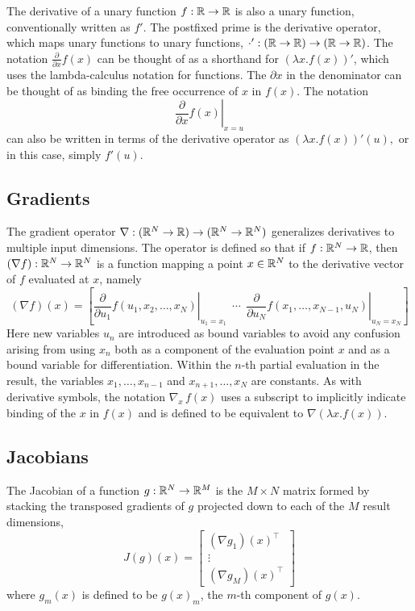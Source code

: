\documentclass[10pt]{article}
\begin{document}
The derivative of a unary function $f:\mathbb{R} \rightarrow \mathbb{R}$ is
also a unary function, conventionally written as $f'$.  The postfixed prime is
the derivative operator, which maps unary functions to unary
functions, $\cdot' : \left(\mathbb{R} \rightarrow \mathbb{R}\right)
\rightarrow \left(\mathbb{R} \rightarrow \mathbb{R}\right)$.  The notation
$\frac{\partial}{\partial x} f(x)$ can be thought of as a shorthand
for $\left( \lambda x. f(x) \right)'$, which uses the lambda-calculus
notation for functions. The $\partial x$ in the denominator can be
thought of as binding the free occurrence of $x$ in $f(x)$.  The
notation
\[
\left. \frac{\partial}{\partial x} f(x) \right|_{x = u}
\]
can also be written in terms of the derivative operator as $\left(
  \lambda x. f(x) \right)'(u),$ or in this case, simply $f'(u)$.

\subsection{Gradients}

The gradient operator $\nabla:(\mathbb{R}^N \rightarrow \mathbb{R})\rightarrow
(\mathbb{R}^N \rightarrow \mathbb{R}^N)$ generalizes derivatives to multiple
input dimensions.  The operator is defined so that if
$f : \mathbb{R}^N \rightarrow \mathbb{R}$, then $(\nabla f):\mathbb{R}^N \rightarrow
\mathbb{R}^N$ is a function mapping a point $x \in \mathbb{R}^N$ to the
derivative vector of $f$ evaluated at $x$, namely
%
\[
(\nabla f)(x) 
= 
\left[
  \left. 
    \frac{\partial}{\partial u_1} f(u_1,x_2,\ldots,x_N)
  \right|_{u_1 = x_1}
  \ \ \cdots \ \ 
  \left. 
    \frac{\partial}{\partial u_N}  f(x_1,\ldots,x_{N-1},u_N)
   \right|_{u_N = x_N}
\right]
\]
%
Here new variables $u_n$ are introduced as bound variables to avoid
any confusion arising from using $x_n$ both as a component of the
evaluation point $x$ and as a bound variable for differentiation.
Within the $n$-th partial evaluation in the result, the variables
$x_1,\ldots,x_{n-1}$ and $x_{n+1},\ldots,x_N$ are constants.  As with
derivative symbols, the notation $\nabla_{\!x} \, f(x)$ uses a
subscript to implicitly indicate binding of the $x$ in $f(x)$ and is
defined to be equivalent to $\nabla(\lambda x. f(x))$.

\subsection{Jacobians}

The Jacobian of a function $g : \mathbb{R}^N \rightarrow \mathbb{R}^M$ is 
the $M \times N$ matrix formed by stacking the transposed gradients of $g$ projected down to
each of the $M$ result dimensions,
%
\[
J(g)(x) = 
\left[
\begin{array}{c}
(\nabla g_1)(x)^{\top}
\\[2pt]
\vdots
\\[2pt]
(\nabla g_M)(x)^{\top}
\end{array}
\right]
\]
%
where $g_m(x)$ is defined to be $g(x)_m$, the $m$-th component of $g(x)$.

\clearpage
\nocite{Hogan:2014}
\nocite{Neal:2003}



\end{document}
